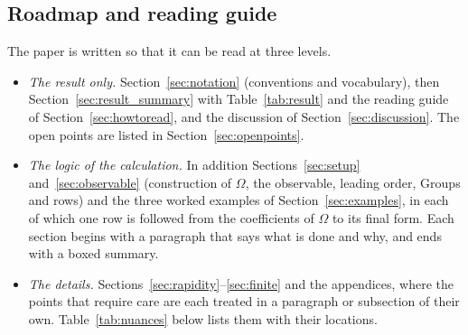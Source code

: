\subsection*{Roadmap and reading guide}\label{sec:roadmap}

The paper is written so that it can be read at three levels.
\begin{itemize}
\item \emph{The result only.} Section~\ref{sec:notation} (conventions and vocabulary), then Section~\ref{sec:result_summary} with Table~\ref{tab:result} and the reading guide of Section~\ref{sec:howtoread}, and the discussion of Section~\ref{sec:discussion}. The open points are listed in Section~\ref{sec:openpoints}.
\item \emph{The logic of the calculation.} In addition Sections~\ref{sec:setup} and~\ref{sec:observable} (construction of $\Omega$, the observable, leading order, Groups and rows) and the three worked examples of Section~\ref{sec:examples}, in each of which one row is followed from the coefficients of $\Omega$ to its final form. Each section begins with a paragraph that says what is done and why, and ends with a boxed summary.
\item \emph{The details.} Sections~\ref{sec:rapidity}--\ref{sec:finite} and the appendices, where the points that require care are each treated in a paragraph or subsection of their own. Table~\ref{tab:nuances} below lists them with their locations.
\end{itemize}
